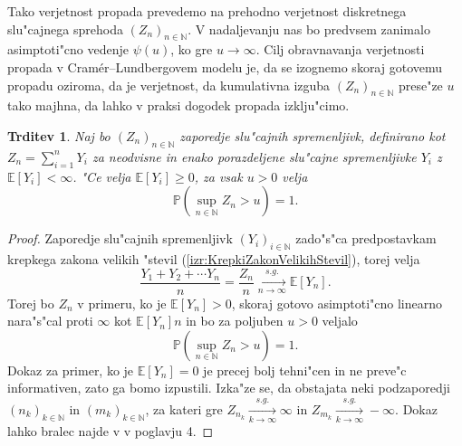 \documentclass[12pt, a4paper, reqno]{amsart}
\theoremstyle{definition}
\theoremstyle{plain}
\newtheorem{trditev}[definicija]{Trditev}
\newcommand{\N}{\mathbb{N}}
\newcommand{\E}{\mathbb{E}}
\newcommand{\Prob}{\mathbb{P}}
\newcommand{\1}{\mathds{1}}
\begin{document}
        Tako verjetnost propada prevedemo na prehodno verjetnost diskretnega slu"cajnega 
        sprehoda $(Z_n)_{n\in\N}$. V nadaljevanju nas bo predvsem zanimalo asimptoti"cno 
        vedenje $\psi(u)$, ko gre $u\rightarrow\infty$. Cilj obravnavanja verjetnosti propada v 
        Cramér--Lundbergovem modelu je, da se izognemo skoraj gotovemu propadu oziroma, da je verjetnost, 
        da kumulativna izguba $(Z_n)_{n\in\N}$ prese"ze $u$
        tako majhna, da lahko v praksi dogodek propada izklju"cimo. 

        \begin{trditev}
            Naj bo $(Z_n)_{n\in\N}$ zaporedje slu"cajnih spremenljivk, definirano kot 
            $Z_n = \sum_{i=1}^nY_i$ za neodvisne in enako porazdeljene slu"cajne spremenljivke 
            $Y_i$ z $\E\left[Y_i\right] < \infty$. 
            "Ce velja $\E\left[Y_i\right] \geq 0$, za vsak $u>0$ velja
            \begin{equation*}
                \Prob\left(\sup_{n\in\N}Z_n > u\right) = 1.
            \end{equation*}
            \label{trd:propadZVerjetnostjo1}
        \end{trditev}

        \begin{proof}
            Zaporedje slu"cajnih spremenljivk $(Y_i)_{i\in\N}$ zado"s"ca predpostavkam krepkega zakona
            velikih "stevil (\ref{izr:KrepkiZakonVelikihStevil}), torej velja
            \begin{equation*}
                \frac{Y_1 + Y_2 + \cdots Y_n}{n} = \frac{Z_n}{n} \xrightarrow[n\to\infty]{s.g.} \E\left[Y_n\right].
            \end{equation*}
            Torej bo $Z_n$ v primeru, ko je $\E\left[Y_n\right]>0$, 
             skoraj gotovo asimptoti"cno linearno nara"s"cal proti $\infty$ kot $\E\left[Y_n\right] n$ in 
             bo za poljuben $u>0$ veljalo 
            \begin{equation*}
                \Prob\left(\sup_{n\in\N}Z_n > u\right) = 1.
            \end{equation*}
            Dokaz za primer, ko je $\E\left[Y_n\right] = 0$ je precej bolj tehni"cen in ne preve"c informativen, zato 
            ga bomo izpustili. Izka"ze se, da obstajata neki podzaporedji $(n_k)_{k\in\N}$ in $(m_k)_{k\in\N}$, 
            za kateri gre
            $Z_{n_k} \xrightarrow[k\to\infty]{s.g.}\infty$ in 
            $Z_{m_k} \xrightarrow[k\to\infty]{s.g.}-\infty$.
            Dokaz lahko bralec najde v \cite{6} v poglavju 4.
        \end{proof}
\end{document}
